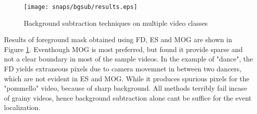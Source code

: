 \begin{figure}[htpb]
   \begin{center}
	    \texttt{[image: snaps/bgsub/results.eps]}     
     \caption {Background subtraction techniques on multiple video classes}
   \label{fig:bgsub}
   \end{center}
 \end{figure}
\par Results of foreground mask obtained using FD, ES and MOG are shown in Figure \ref{fig:bgsub}. Eventhough MOG is most preferred, but found it provide sparse and not a clear boundary in most of the sample videos. In the example of "dance", the FD yields extraneous pixels due to camera movemnet in between two dancers, which are not evident in ES and MOG. While it produces spurious pixels for the "pommello" video, because of sharp background. All methods terribly fail incase of grainy videos, hence background subtraction alone cant be suffice for the event localization.

